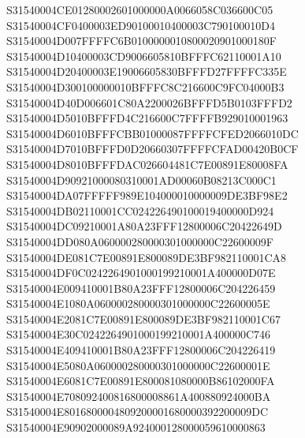 \documentclass[12pt,a4paper]{article}
\begin{document}
\begin{framed}
{S31540004CE01280002601000000A0066058C036600C05\newline
S31540004CF0400003ED90100010400003C790100010D4\newline
S31540004D007FFFFC6B0100000010800020901000180F\newline
S31540004D10400003CD9006605810BFFFC62110001A10\newline
S31540004D20400003E19006605830BFFFD27FFFFC335E\newline
S31540004D300100000010BFFFC8C216600C9FC04000B3\newline
S31540004D40D006601C80A2200026BFFFD5B0103FFFD2\newline
S31540004D5010BFFFD4C216600C7FFFFB929010001963\newline
S31540004D6010BFFFCBB01000087FFFFCFED2066010DC\newline
S31540004D7010BFFFD0D20660307FFFFCFAD00420B0CF\newline
S31540004D8010BFFFDAC026604481C7E00891E80008FA\newline
S31540004D90921000080310001AD00060B08213C000C1\newline
S31540004DA07FFFFF989E104000010000009DE3BF98E2\newline
S31540004DB02110001CC024226490100019400000D924\newline
S31540004DC09210001A80A23FFF12800006C20422649D\newline
S31540004DD080A060000280000301000000C22600009F\newline
S31540004DE081C7E00891E800089DE3BF982110001CA8\newline
S31540004DF0C0242264901000199210001A400000D07E\newline
S31540004E009410001B80A23FFF12800006C204226459\newline
S31540004E1080A060000280000301000000C22600005E\newline
S31540004E2081C7E00891E800089DE3BF982110001C67\newline
S31540004E30C0242264901000199210001A400000C746\newline
S31540004E409410001B80A23FFF12800006C204226419\newline
S31540004E5080A060000280000301000000C22600001E\newline
S31540004E6081C7E00891E800081080000B86102000FA\newline
S31540004E708092400816800008861A400880924000BA\newline
S31540004E8016800004809200001680000392200009DC\newline
S31540004E90902000089A924000128000059610000863\newline
}
\end{framed}
\end{document}
